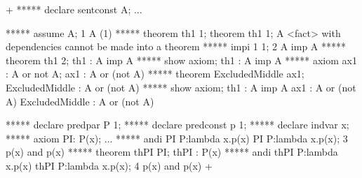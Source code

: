 



\gfexample+
   ***** declare sentconst A;
   ...

   ***** assume A;
   1   A     (1)
   ***** theorem th1 1;
   theorem th1 1;
   A <fact> with dependencies cannot be made into a theorem
   ***** impi 1 1;
   2   A imp A     
   ***** theorem th1 2;
   th1 : A imp A
   ***** show axiom;
   th1 : A imp A
   ***** axiom ax1 : A or not A;
   ax1 : A or (not A)
   ***** theorem ExcludedMiddle ax1;
   ExcludedMiddle : A or (not A)
   ***** show axiom;
   th1 : A imp A
   ax1 : A or (not A)
   ExcludedMiddle : A or (not A)

   ***** declare predpar P 1;
   ***** declare predconst p 1;
   ***** declare indvar x;
   ***** axiom PI: P(x);
   ...
   ***** andi PI P:lambda x.p(x) PI P:lambda x.p(x);
   3   p(x) and p(x)     
   ***** theorem thPI PI;
   thPI : P(x)
   ***** andi thPI P:lambda x.p(x) thPI P:lambda x.p(x);
   4   p(x) and p(x)     
+
   




